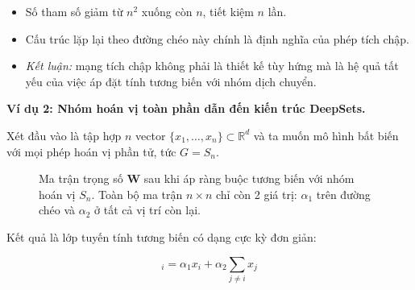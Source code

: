 \begin{itemize}
    \item Số tham số giảm từ $n^2$ xuống còn $n$, tiết kiệm $n$ lần.
    \item Cấu trúc lặp lại theo đường chéo này chính là định nghĩa của phép tích chập.
    \item \textit{Kết luận:} mạng tích chập không phải là thiết kế tùy hứng mà là hệ quả tất yếu của việc áp đặt tính tương biến với nhóm dịch chuyển.
\end{itemize}

\vspace{0.5em}
\textbf{Ví dụ 2: Nhóm hoán vị toàn phần dẫn đến kiến trúc DeepSets.}

Xét đầu vào là tập hợp $n$ vector $\{x_1, \ldots, x_n\} \subset \mathbb{R}^d$ và ta muốn mô hình bất biến với mọi phép hoán vị phần tử, tức $G = S_n$.

\begin{figure}[H]
\centering
{}
\caption{Ma trận trọng số $\mathbf{W}$ sau khi áp ràng buộc tương biến với nhóm hoán vị $S_n$. Toàn bộ ma trận $n \times n$ chỉ còn 2 giá trị: $\alpha_1$ trên đường chéo và $\alpha_2$ ở tất cả vị trí còn lại.}
\label{fig:permutation-matrix}
\end{figure}

Kết quả là lớp tuyến tính tương biến có dạng cực kỳ đơn giản:

\begin{equation}
    [\mathbf{F}(\mathbf{X})]_i = \alpha_1 x_i + \alpha_2 \sum_{j \neq i} x_j
    \label{eq:deepset-layer}
\end{equation}

